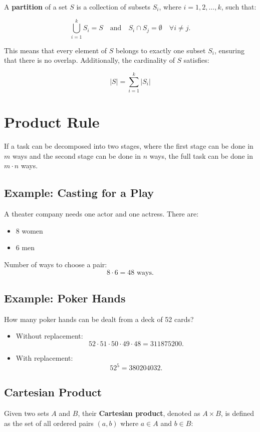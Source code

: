 \documentclass[11pt]{article}
\newcommand{\card}[1]{\lvert #1 \rvert}
\begin{document}
A \textbf{partition} of a set $ S $ is a collection of subsets $ S_i $, where $ i = 1, 2, \dots, k $, such that:

\[
\bigcup_{i=1}^{k} S_i = S \quad \text{and} \quad S_i \cap S_j = \emptyset \quad \forall i \neq j.
\]

This means that every element of $ S $ belongs to exactly one subset $ S_i $, ensuring that there is no overlap.
Additionally, the cardinality of $ S $ satisfies:

\[
\card{S} = \sum_{i=1}^{k} \card{S_i}
\]

\section{Product Rule}

If a task can be decomposed into two stages, where the first stage can be done in $m$ ways and the second stage can be done in $n$ ways, the full task can be done in $m \cdot n$ ways.

\subsection*{Example: Casting for a Play}
A theater company needs one actor and one actress. There are:
\begin{itemize}
    \item 8 women
    \item 6 men
\end{itemize}
Number of ways to choose a pair:
\[
8 \cdot 6 = 48 \text{ ways.}
\]

\subsection*{Example: Poker Hands}
How many poker hands can be dealt from a deck of 52 cards?

\begin{itemize}
\item Without replacement:
\[ 
52 \cdot 51 \cdot 50 \cdot 49 \cdot 48 = 311875200.
\]

\item With replacement:
\[
52^5 = 380204032.
\]
\end{itemize}

\subsection{Cartesian Product}

Given two sets $ A $ and $ B $, their \textbf{Cartesian product}, denoted as $ A \times B $, is defined as the set of all ordered pairs $ (a, b) $ where $ a \in A $ and $ b \in B $:
\end{document}
